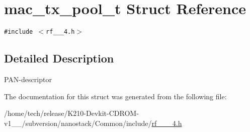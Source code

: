 \hypertarget{structmac__tx__pool__t}{
\section{mac\_\-tx\_\-pool\_\-t Struct Reference}
\label{structmac__tx__pool__t}
}
{\tt \#include $<$rf\_\_\_\-4.h$>$}



\subsection{Detailed Description}
PAN-descriptor 



The documentation for this struct was generated from the following file:\begin{CompactItemize}
\item 
/home/tech/release/K210-Devkit-CDROM-v1\_\_/subversion/nanostack/Common/include/\hyperlink{rf__802__15__4_8h}{rf\_\_\_\-4.h}\end{CompactItemize}
